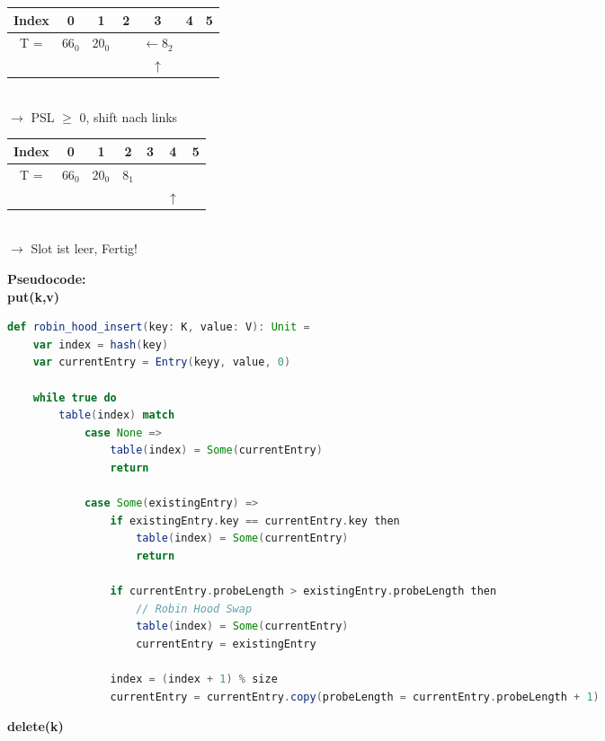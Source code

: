 \begin{multicols}{2}
\begin{center}
\begin{tabular}{|c|c|c|c|c|c|c|}
\hline
Index & 0 & 1 & 2 & 3 & 4 & 5\\
\hline
T = & $66_0$ & $20_0$ &  & $\leftarrow 8_2$ & &\\
\hline
&  &  &  & $\uparrow$ & &\\
\hline
\end{tabular}\\
$\rightarrow$ PSL $\geq$ 0, shift nach links\\
\end{center}

\begin{center}
\begin{tabular}{|c|c|c|c|c|c|c|}
\hline
Index & 0 & 1 & 2 & 3 & 4 & 5\\
\hline
T = & $66_0$ & $20_0$ & $8_1$ &  & &\\
\hline
&  &  &  &  & $\uparrow$ &\\
\hline
\end{tabular}\\
$\rightarrow$ Slot ist leer, Fertig!\\
\end{center}
\end{multicols}



\noindent
\textbf{Pseudocode:}\\

\noindent
\textbf{put(k,v)}

\begin{lstlisting}[language=Scala]
def robin_hood_insert(key: K, value: V): Unit =
	var index = hash(key)
	var currentEntry = Entry(keyy, value, 0)
	
	while true do
		table(index) match
			case None =>
				table(index) = Some(currentEntry)
				return
			
			case Some(existingEntry) =>
				if existingEntry.key == currentEntry.key then
					table(index) = Some(currentEntry)
					return
				
				if currentEntry.probeLength > existingEntry.probeLength then
					// Robin Hood Swap
					table(index) = Some(currentEntry)
					currentEntry = existingEntry
					
				index = (index + 1) % size
				currentEntry = currentEntry.copy(probeLength = currentEntry.probeLength + 1)
\end{lstlisting}

\noindent
\textbf{delete(k)}


